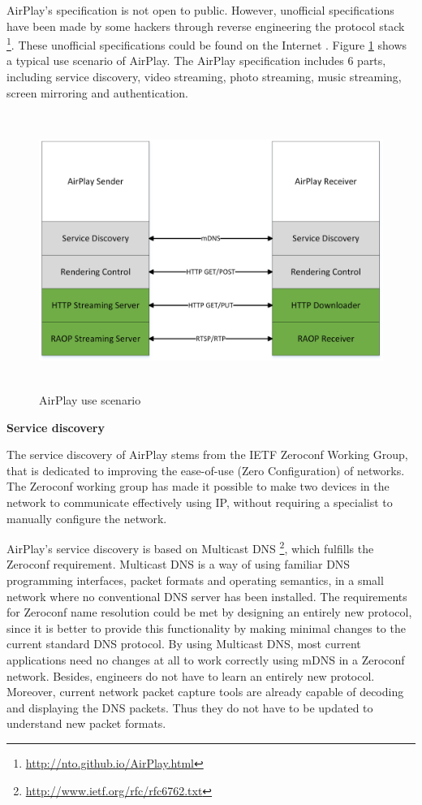 AirPlay's specification is not open to public. However, unofficial
specifications have been made by some hackers through reverse engineering the
protocol stack \footnote{\url{http://nto.github.io/AirPlay.html}}. These
unofficial specifications could be found on the Internet \cite{AirPlay-spec}.
Figure \ref{airplay_use_scenario} shows a typical use scenario
of AirPlay. The AirPlay specification includes 6 parts, including service discovery, video
streaming, photo streaming, music streaming, screen mirroring and
authentication.
\clearpage
\begin{figure}[htb] 
\centering \includegraphics[height=9cm]{charts/airplay} 
\caption{AirPlay use scenario\label{airplay_use_scenario}} 
\end{figure}  
\textbf{Service discovery}

The service discovery of AirPlay stems from the IETF Zeroconf Working Group, 
that is dedicated to improving the ease-of-use (Zero Configuration) of networks.
The Zeroconf working group has made it possible to make two devices in the 
network to communicate effectively using IP, without requiring a specialist to manually 
configure the network.

AirPlay's service discovery is based on Multicast DNS \cite{multicastdns}
\footnote{\url{http://www.ietf.org/rfc/rfc6762.txt}}, which fulfills the
Zeroconf requirement. Multicast DNS is a way of using familiar DNS programming interfaces, packet formats and operating semantics, in a small 
network where no conventional DNS server has been installed. The requirements 
for Zeroconf name resolution could be met by designing an entirely new 
protocol, since it is better to provide this functionality by making minimal changes 
to the current standard DNS protocol. By using Multicast DNS, most current 
applications need no changes at all to work correctly using mDNS in a Zeroconf network. Besides,
engineers do not have to learn an entirely new protocol. Moreover, current network 
packet capture tools are already capable of  decoding and displaying the DNS packets. Thus they do not 
have to be updated to understand new packet formats.

